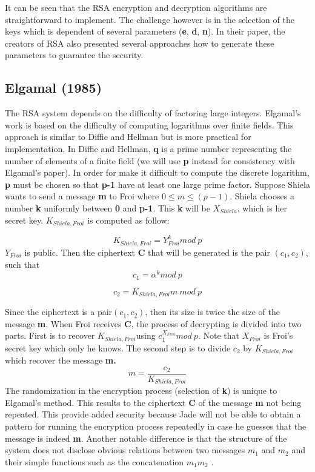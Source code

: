 \documentclass{article}
\begin{document}
It can be seen that the RSA encryption and decryption algorithms are
straightforward to implement. The challenge however is in the selection
of the keys which is dependent of several parameters (\textbf{e},
\textbf{d}, \textbf{n}). In their paper, the creators of RSA also
presented several approaches how to generate these parameters to guarantee
the security.


\subsection{Elgamal (1985)}

The RSA\cite{rivest_method_1978} system depends on the difficulty
of factoring large integers. Elgamal's work is based on the difficulty
of computing logarithms over finite fields\cite{elgamal_public_1985}.
This approach is similar to Diffie and Hellman but is more practical
for implementation. In Diffie and Hellman, \textbf{q} is a prime number
representing the number of elements of a finite field (we will use
\textbf{p} instead for consistency with Elgamal's paper). In order
for make it difficult to compute the discrete logarithm, \textbf{p}
must be chosen so that \textbf{p-1} have at least one large prime
factor. Suppose Shiela wants to send a message \textbf{m} to Froi
where $0\leq m\leq(p-1)$. Shiela chooses a number \textbf{k} uniformly
between \textbf{0} and \textbf{p-1}. This \textbf{k} will be $X_{Shiela}$,
which is her secret key. $K_{Shiela,Froi}$ is computed as follow:

\[
K_{Shiela,Froi}=Y_{Froi}^{k}mod\: p
\]
 $Y_{Froi}$ is public. Then the ciphertext \textbf{C} that will be
generated is the pair $(c_{1},c_{2})$, such that
\[
c_{1}=\alpha^{k}mod\: p
\]


\[
c_{2}=K_{Shiela,Froi}m\: mod\: p
\]


Since the ciphertext is a pair$(c_{1},c_{2})$, then its size is twice
the size of the message \textbf{m}. When Froi receives \textbf{C},
the process of decrypting is divided into two parts. First is to recover
$K_{Shiela,Froi}$using $c_{1}^{X_{Froi}}mod\: p$. Note that $X_{Froi}$
is Froi's secret key which only he knows. The second step is to divide
$c_{2}$ by $K_{Shiela,Froi}$ which recover the message \textbf{m.
\[
m=\frac{c_{2}}{K_{Shiela,Froi}}
\]
 }The randomization in the encryption process (selection of \textbf{k})
is unique to Elgamal's method. This results to the ciphertext \textbf{C}
of the message \textbf{m} not being repeated. This provide added security
because Jade will not be able to obtain a pattern for running the
encryption process repeatedly in case he guesses that the message
is indeed \textbf{m}. Another notable difference is that the structure
of the system does not disclose obvious relations between two messages
$m_{1}$ and $m_{2}$ and their simple functions such as the concatenation
$m_{1}m_{2}$\cite{elgamal_public_1985} .
\end{document}
